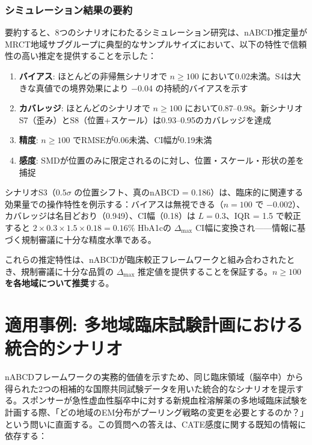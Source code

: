 \documentclass[
  a4paper,
  11pt]{ltjsarticle}
\providecommand{\tightlist}{%
  \setlength{\itemsep}{0pt}\setlength{\parskip}{0pt}}\usepackage{longtable,booktabs,array}
\begin{document}
\subsubsection{シミュレーション結果の要約}\label{ux30b7ux30dfux30e5ux30ecux30fcux30b7ux30e7ux30f3ux7d50ux679cux306eux8981ux7d04}

要約すると、8つのシナリオにわたるシミュレーション研究は、nABCD推定量がMRCT地域サブグループに典型的なサンプルサイズにおいて、以下の特性で信頼性の高い推定を提供することを示した：

\begin{enumerate}
\def\labelenumi{\arabic{enumi}.}
\tightlist
\item
  \textbf{バイアス}: ほとんどの非帰無シナリオで \(n \geq 100\)
  において0.02未満。S4は大きな真値での境界効果により −0.04
  の持続的バイアスを示す
\item
  \textbf{カバレッジ}: ほとんどのシナリオで \(n \geq 100\)
  において0.87--0.98。新シナリオS7（歪み）とS8（位置+スケール）は0.93--0.95のカバレッジを達成
\item
  \textbf{精度}: \(n \geq 100\) でRMSEが0.06未満、CI幅が0.19未満
\item
  \textbf{感度}:
  SMDが位置のみに限定されるのに対し、位置・スケール・形状の差を捕捉
\end{enumerate}

シナリオS3（\(0.5\sigma\) の位置シフト、真のnABCD =
0.186）は、臨床的に関連する効果量での操作特性を例示する：バイアスは無視できる（\(n = 100\)
で −0.002）、カバレッジは名目どおり（0.949）、CI幅（0.18）は
\(L = 0.3\)、IQR = 1.5 で較正すると
\(2 \times 0.3 \times 1.5 \times 0.18 = 0.16\)\% HbA1cの
\(\Delta_{\max}\)
CI幅に変換され------情報に基づく規制審議に十分な精度水準である。

これらの推定特性は、nABCDが臨床較正フレームワークと組み合わされたとき、規制審議に十分な品質の
\(\Delta_{\max}\) 推定値を提供することを保証する。\textbf{\(n \geq 100\)
を各地域について推奨}する。

\section{適用事例:
多地域臨床試験計画における統合的シナリオ}\label{ux9069ux7528ux4e8bux4f8b-ux591aux5730ux57dfux81e8ux5e8aux8a66ux9a13ux8a08ux753bux306bux304aux3051ux308bux7d71ux5408ux7684ux30b7ux30caux30eaux30aa}

nABCDフレームワークの実務的価値を示すため、同じ臨床領域（脳卒中）から得られた2つの相補的な国際共同試験データを用いた統合的なシナリオを提示する。スポンサーが急性虚血性脳卒中に対する新規血栓溶解薬の多地域臨床試験を計画する際、「どの地域のEM分布がプーリング戦略の変更を必要とするのか？」という問いに直面する。この質問への答えは、CATE感度に関する既知の情報に依存する：
\end{document}
